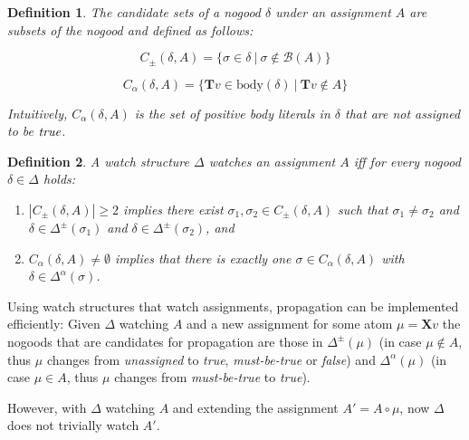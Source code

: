 \documentclass{vutinfth} %
\newtheorem{definition}{Definition}[section]
\newcommand{\mbt}{must-be-true}
\newcommand{\bass}{\mathcal{B}}
\newcommand{\ass}{A}
\newcommand{\bT}{\mathbf{T}}
\newcommand{\bX}{\mathbf{X}}
\newcommand{\cdpm}{C_\pm}
\newcommand{\cdal}{C_\alpha}
\newcommand{\dpm}{\Delta^\pm}
\newcommand{\dal}{\Delta^\alpha}
\newcommand{\lowinv}{watches\xspace}
\newcommand{\bodyf}{\mathrm{body}}
\newcommand{\sgl}{\mu}
\newcommand{\bsgl}{\sigma}
\begin{document}
\begin{definition}
The \emph{candidate sets} of a nogood $\delta$ under an assignment $A$ are subsets of the nogood  and defined as follows:

$$\cdpm(\delta, A) = \{\bsgl \in \delta \ | \ \bsgl \not \in \bass(\ass)\}$$

$$\cdal(\delta, A) = \{ \bT v \in \bodyf(\delta) \ | \ \bT v \not \in \ass \}$$

Intuitively, $C_\alpha(\delta, A)$ is the set of positive body literals in $\delta$ that are not assigned to be $\emph{true}$.
\end{definition}

\begin{definition}

A watch structure $\Delta$ \emph{\lowinv} an assignment $\ass$ iff for every nogood $\delta \in \Delta$ holds:

\begin{enumerate}
\item $|\cdpm(\delta, A)| \geq 2$ implies there exist $\bsgl_1, \bsgl_2 \in \cdpm(\delta, A)$ such that $\bsgl_1 \not = \bsgl_2$ and $\delta \in \dpm(\bsgl_1)$ and $\delta \in \dpm(\bsgl_2)$, and
\item $\cdal(\delta, A) \not = \emptyset$ implies that there is exactly one $\bsgl \in \cdal(\delta, A)$ with $\delta \in \dal(\bsgl)$.
\end{enumerate}
\end{definition}

Using watch structures that watch assignments, propagation can be implemented efficiently: Given $\Delta$ watching $\ass$ and a new assignment for some atom $\sgl = \bX v$ the nogoods that are candidates for propagation are those in $\dpm(\sgl)$ (in case $\sgl \not \in A$, thus $\sgl$ changes from \emph{unassigned} to \emph{true}, \emph{\mbt} or \emph{false}) and $\dal(\sgl)$ (in case $\sgl \in A$, thus $\sgl$ changes from \emph{\mbt} to \emph{true}).

However, with $\Delta$ watching $\ass$ and extending the assignment $\ass' = \ass \circ \sgl$, now $\Delta$ does not trivially watch $\ass'$.
\end{document}
